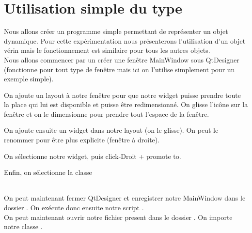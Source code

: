 { 
 
 

 
\section{Utilisation simple du type}

Nous allons créer un programme simple permettant de représenter un objet dynamique. Pour cette expérimentation nous présenterons l'utilisation d'un objet vérin mais le fonctionnement est similaire pour tous les autres objets.\\

Nous allons commencer par un créer une fenêtre MainWindow sous QtDesigner (fonctionne pour tout type de fenêtre mais ici on l'utilise simplement pour un exemple simple).


On ajoute un layout à notre fenêtre pour que notre widget puisse prendre toute la place qui lui est disponible et puisse être redimensionné. On glisse l'icône sur la fenêtre et on le dimensionne pour prendre tout l'espace de la fenêtre.


On ajoute ensuite un widget dans notre layout (on le glisse). On peut le renommer pour être plus explicite (fenêtre à droite).


On sélectionne notre widget, puis click-Droit + promote to. 


Enfin, on sélectionne la classe 

\textcolor{red}{} \\

On peut maintenant fermer QtDesigner et enregistrer notre MainWindow dans le dossier . On exécute donc ensuite notre script .\\

On peut maintenant ouvrir notre  fichier  present dans le dossier . On importe notre classe .

}
